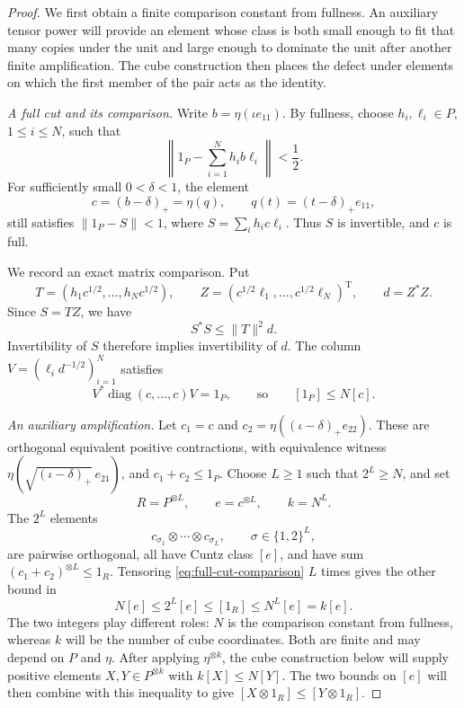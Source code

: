 \begin{proof}
We first obtain a finite comparison constant from fullness. An auxiliary
tensor power will provide an element whose class is both small enough to
fit that many copies under the unit and large enough to dominate the
unit after another finite amplification. The cube construction then
places the defect under elements on which the first member of the pair
acts as the identity.

\emph{A full cut and its comparison.}
Write \(b=\eta(\iota e_{11})\). By fullness, choose
\(h_i,\ell_i\in P\), \(1\le i\le N\), such that
\[
\left\|1_P-\sum_{i=1}^N h_i b\ell_i\right\|<\frac12.
\]
For sufficiently small \(0<\delta<1\), the element
\[
c=(b-\delta)_+
=\eta(q),\qquad
q(t)=(t-\delta)_+e_{11},
\]
still satisfies
\(\|1_P-S\|<1\), where \(S=\sum_i h_i c\ell_i\).
Thus \(S\) is invertible, and \(c\) is full.

We record an exact matrix comparison. Put
\[
T=(h_1c^{1/2},\ldots,h_Nc^{1/2}),\qquad
Z=(c^{1/2}\ell_1,\ldots,c^{1/2}\ell_N)^{\mathrm T},
\qquad d=Z^*Z.
\]
Since \(S=TZ\), we have
\[
S^*S\le\|T\|^2d.
\]
Invertibility of \(S\) therefore implies invertibility of \(d\).
The column \(V=(\ell_i d^{-1/2})_{i=1}^N\) satisfies
\begin{equation}\label{eq:full-cut-comparison}
V^*\operatorname{diag}(c,\ldots,c)V=1_P,
\qquad\text{so}\qquad [1_P]\le N[c].
\end{equation}

\emph{An auxiliary amplification.}
Let \(c_1=c\) and \(c_2=\eta((\iota-\delta)_+e_{22})\).
These are orthogonal equivalent positive contractions, with equivalence
witness \(\eta(\sqrt{(\iota-\delta)_+}\,e_{21})\), and
\(c_1+c_2\le1_P\).
Choose \(L\ge1\) such that \(2^L\ge N\), and set
\[
R=P^{\otimes L},\qquad e=c^{\otimes L},\qquad k=N^L.
\]
The \(2^L\) elements
\[
c_{\sigma_1}\otimes\cdots\otimes c_{\sigma_L},
\qquad \sigma\in\{1,2\}^L,
\]
are pairwise orthogonal, all have Cuntz class \([e]\), and have sum
\((c_1+c_2)^{\otimes L}\le1_R\).
Tensoring \eqref{eq:full-cut-comparison} \(L\) times gives the other
bound in
\begin{equation}\label{eq:cone-amplification}
N[e]\le2^L[e]\le[1_R]\le N^L[e]=k[e].
\end{equation}
The two integers play different roles: \(N\) is the comparison constant
from fullness, whereas \(k\) will be the number of cube coordinates.
Both are finite and may depend on \(P\) and \(\eta\).
After applying \(\eta^{\otimes k}\), the cube construction below will supply
positive elements \(X,Y\in P^{\otimes k}\) with \(k[X]\le N[Y]\).
The two bounds on \([e]\) will then combine with this
inequality to give \([X\otimes1_R]\le[Y\otimes1_R]\).


\end{proof}
